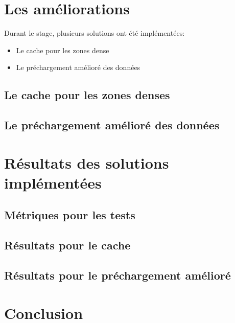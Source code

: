 \documentclass{beamer}
\begin{document}
  \section{Les améliorations}
  \begin{frame}
	Durant le stage, plusieurs solutions ont été implémentées:
	\begin{itemize}
		\item Le cache pour les zones dense
		\item Le préchargement amélioré des données
	\end{itemize}
  \end{frame}

  \subsection{Le cache pour les zones denses}
  \begin{frame}
  \end{frame}

  \begin{frame}
  \end{frame}
	
  \subsection{Le préchargement amélioré des données}
  \begin{frame}
  \end{frame}
	
  \begin{frame}
  \end{frame}
	
  \section{Résultats des solutions implémentées}
  \subsection{Métriques pour les tests}
  \begin{frame}
  \end{frame}

  \subsection{Résultats pour le cache}
  \begin{frame}
  \end{frame}
	
  \subsection{Résultats pour le préchargement amélioré}
  \begin{frame}
  \end{frame}
  
  \section{Conclusion}
  \begin{frame}
  \end{frame}
  
  
\end{document}
